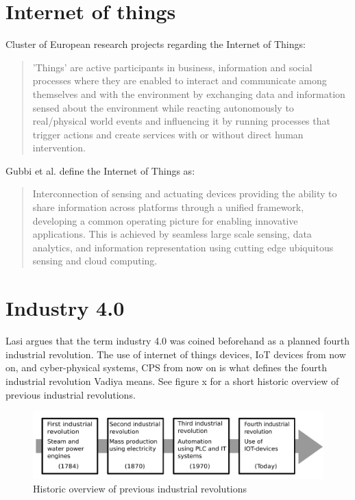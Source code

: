 \section{Internet of things}
Cluster of European research projects regarding the Internet of Things:
\begin{quote}
    'Things' are active participants in business, information and social processes where they are enabled to interact and communicate among themselves and with the environment by exchanging data and information sensed about the environment while reacting autonomously to real/physical world events and influencing it by running processes that trigger actions and create services with or without direct human intervention.\cite{Gubbi2013}
\end{quote} 

Gubbi et al. define the Internet of Things as:
\begin{quote}
    Interconnection of sensing and actuating devices providing the ability to share information across platforms through a unified framework, developing a common operating picture for enabling innovative applications. 
    This is achieved by seamless large scale sensing, data analytics, and information representation using cutting edge ubiquitous sensing and cloud computing.\cite{Gubbi2013}
\end{quote}

\section{Industry 4.0}
Lasi argues that the term industry 4.0 was coined beforehand as a planned fourth industrial revolution.\cite{Lasi2014}
The use of internet of things devices, IoT devices from now on, and cyber-physical systems, CPS from now on is what defines the fourth industrial revolution Vadiya means.\cite{Vaidya2018}
See figure x for a short historic overview of previous industrial revolutions.   
\begin{figure}
    \centering
    \includegraphics[width=\textwidth]{Pictures/Industrial_revolution.pdf} 
    \caption{Historic overview of previous industrial revolutions}
    \label{Indutrial revolutions}
\end{figure}

